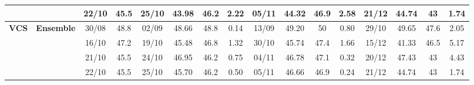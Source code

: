\begin{table}[!h]
\begin{tabular}{llcc|cccc|cccc|cccc}
&
& 22/10 & 45.5 & 25/10 & 43.98 & 46.2 & 2.22 & 05/11 & 44.32 & 46.9 & 2.58 & 21/12 & 44.74 & 43 & 1.74 \\
\midrule



\multirow{4}{*}{\textbf{VCS}} 
& \textbf{Ensemble}
& 30/08 & 48.8 & 02/09 & 48.66 & 48.8 & 0.14 & 13/09 & 49.20 & 50 & 0.80 & 29/10 & 49.65 & 47.6 & 2.05 \\

&
& 16/10 & 47.2 & 19/10 & 45.48 & 46.8 & 1.32 & 30/10 & 45.74 & 47.4 & 1.66 & 15/12 & 41.33 & 46.5 & 5.17 \\

&
& 21/10 & 45.5 & 24/10 & 46.95 & 46.2 & 0.75 & 04/11 & 46.78 & 47.1 & 0.32 & 20/12 & 47.43 & 43 & 4.43 \\

&
& 22/10 & 45.5 & 25/10 & 45.70 & 46.2 & 0.50 & 05/11 & 46.66 & 46.9 & 0.24 & 21/12 & 44.74 & 43 & 1.74 \\


\bottomrule
\end{tabular}
\end{table}